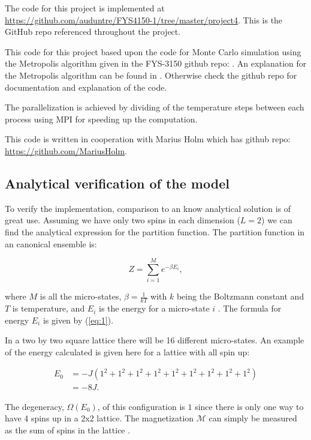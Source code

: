 \documentclass[a4paper, fontsize=11pt]{article}
\begin{document}
The code for this project is implemented at \url{https://github.com/auduntre/FYS4150-1/tree/master/project4}. This is the GitHub repo referenced throughout the project.

This code for this project based upon the code for Monte Carlo simulation using the Metropolis algorithm given in the FYS-3150 github repo: \cite{fys4150}. An explanation for the Metropolis algorithm can be found in \cite[p. 404-405]{Hjort-Jensen}. Otherwise  check the github repo for documentation and explanation of the code.

The parallelization is achieved by dividing of the temperature steps between each process using MPI for speeding up the computation.

This code is written in cooperation with Marius Holm which has github repo: \url{https://github.com/MariusHolm}. 

\subsection{Analytical verification of the model}
To verify the implementation, comparison to an know analytical solution is of great use. Assuming we have only two spins in each dimension ($L=2$) we can find the analytical expression for the partition function. The partition function in an canonical ensemble is:

\begin{equation} \label{eq:2}
Z = \sum_{i=1}^{M}e^{-\beta E_i},
\end{equation}

\noindent
where $M$ is all the micro-states, $\beta = \frac{1}{kT}$ with $k$ being the Boltzmann constant and $T$ is temperature, and $E_i$ is the energy for a micro-state $i$  \cite[p. 422]{Hjort-Jensen}. The formula for energy $E_i$ is given by (\ref{eq:1}).

In a two by two square lattice there will be 16 different micro-states. An example of the energy calculated is given here for a lattice with all spin up:

\begin{equation}
\begin{split}
E_0 & = - J \left(1^2 + 1^2 + 1^2 + 1^2 + 1^2 + 1^2 + 1^2 + 1^2 + 1^2 \right) \\
    & =  -8J.
\end{split}
\end{equation}

The degeneracy, $\Omega(E_0)$, of this configuration is $1$ since there is only one way to have 4 spins up in a 2x2 lattice. The magnetization $\mathcal{M}$ can simply be measured as the sum of spins in the lattice \cite[p. 423]{Hjort-Jensen}.
\end{document}
